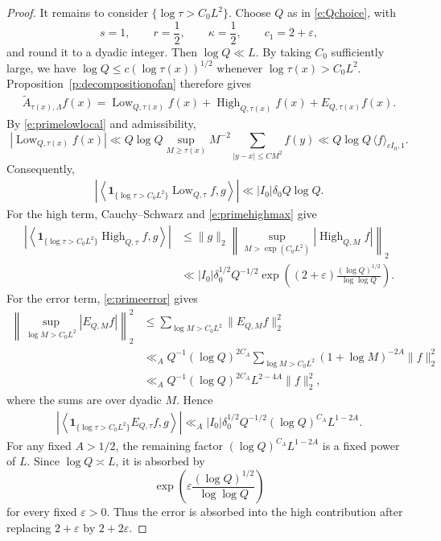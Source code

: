 \documentclass[12pt,reqno]{amsart}
\numberwithin{equation}{section}
\theoremstyle{definition}
\theoremstyle{remark}
\begin{document}
\begin{proof}
It remains to consider \(\{\log\tau>C_0L^2\}\).  Choose \(Q\) as in
\eqref{e:Qchoice}, with
\[
 s=1,\qquad r=\frac12,\qquad\kappa=\frac12,\qquad c_1=2+\varepsilon,
\]
and round it to a dyadic integer.  Then \(\log Q\ll L\).  By taking
\(C_0\) sufficiently large, we have $\log Q\leq c(\log\tau(x))^{1/2}$ whenever $\log\tau(x)>C_0L^2$.
Proposition~\ref{p:decompositionofan} therefore gives
\begin{align}\label{e:decomposproof}
     \widetilde A_{\tau(x),\Lambda}f(x)
 =
 \operatorname{Low}_{Q,\tau(x)}f(x)
 +\operatorname{High}_{Q,\tau(x)}f(x)
 +E_{Q,\tau(x)}f(x).
\end{align}
By \eqref{e:primelowlocal} and admissibility,
\[
 |\operatorname{Low}_{Q,\tau(x)}f(x)|
 \ll Q\log Q
 \sup_{M\geq\tau(x)}M^{-2}
 \sum_{|y-x|\leq CM^2}f(y)
 \ll Q\log Q\,\langle f\rangle_{cI_0,1}.
\]
Consequently,
\begin{align}\label{e:sparse21}
    \left|
 \left\langle
 \mathbf1_{\{\log\tau>C_0L^2\}}
 \operatorname{Low}_{Q,\tau}f,g
 \right\rangle
 \right|
 \ll |I_0|\delta_0Q\log Q.
\end{align}
For the high term, Cauchy--Schwarz and \eqref{e:primehighmax} give
\begin{align}\label{e:sparse22}
 \left|
 \left\langle
 \mathbf1_{\{\log\tau>C_0L^2\}}
 \operatorname{High}_{Q,\tau}f,g
 \right\rangle
 \right|&\leq
 \|g\|_2
 \left\|\sup_{M>\exp(C_0L^2)}
 |\operatorname{High}_{Q,M}f|\right\|_2\\
 &\ll
 |I_0|\delta_0^{1/2}Q^{-1/2}
 \exp\left((2+\varepsilon)\frac{(\log Q)^{1/2}}{\log\log Q}\right).
\end{align}
For the error term, \eqref{e:primeerror}  gives
\begin{align*}
 \left\|\sup_{\log M>C_0L^2}|E_{Q,M}f|\right\|_2^2
 &\leq\sum_{\log M>C_0L^2}\|E_{Q,M}f\|_2^2\\
 &\ll_A Q^{-1}(\log Q)^{2C_A}
 \sum_{\log M>C_0L^2}(1+\log M)^{-2A}\|f\|_2^2\\
 &\ll_A Q^{-1}(\log Q)^{2C_A}L^{2-4A}\|f\|_2^2,
\end{align*}
where the sums are over dyadic \(M\).  Hence
\begin{align}\label{e:sparse23}
    \left|
 \left\langle
 \mathbf1_{\{\log\tau>C_0L^2\}}E_{Q,\tau}f,g
 \right\rangle
 \right|
 \ll_A |I_0|\delta_0^{1/2}Q^{-1/2}
 (\log Q)^{C_A}L^{1-2A}.
\end{align}
For any fixed $A>1/2$, the remaining factor
$(\log Q)^{C_A}L^{1-2A}$ is a fixed power of $L$.  Since
$\log Q\asymp L$, it is absorbed by
\[
 \exp\left(
 \varepsilon\frac{(\log Q)^{1/2}}{\log\log Q}
 \right)
\]
for every fixed $\varepsilon>0$.  Thus the error is absorbed into the
high contribution after replacing $2+\varepsilon$ by $2+2\varepsilon$.




\end{proof}
\end{document}
